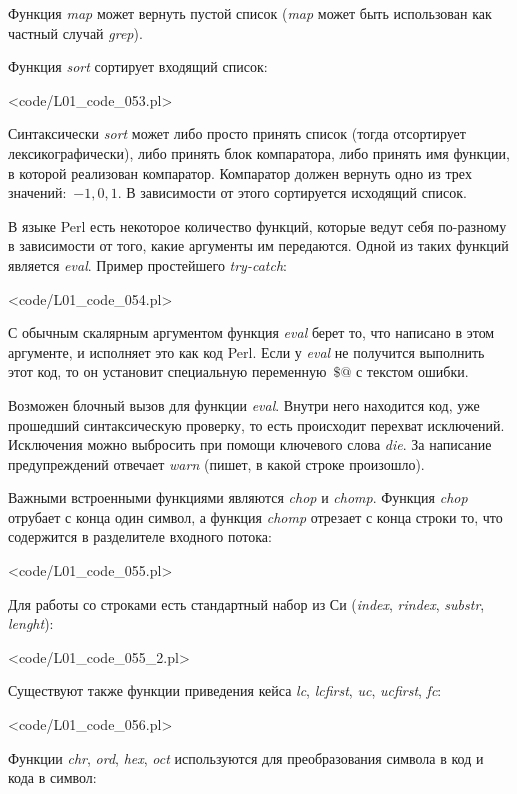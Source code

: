 Функция \textit{map} может вернуть пустой список (\textit{map} может быть использован как частный случай \textit{grep}).

Функция \textit{sort} сортирует входящий список:

\pr<code/L01_code_053.pl>

Синтаксически \textit{sort} может либо просто принять список (тогда отсортирует лексикографически), либо принять блок компаратора, либо принять имя функции, в которой реализован компаратор.
Компаратор должен вернуть одно из трех значений:~$-1,0,1$.
В зависимости от этого сортируется исходящий список.

В языке Perl есть некоторое количество функций, которые ведут себя по-разному в зависимости от того, какие аргументы им передаются.
Одной из таких функций является \textit{eval}.
Пример простейшего \textit{try-catch}:

\pr<code/L01_code_054.pl>

С обычным скалярным аргументом функция \textit{eval} берет то, что написано в этом аргументе, и исполняет это как код Perl.
Если у \textit{eval} не получится выполнить этот код, то он установит специальную переменную~$\$@$ с текстом ошибки.

Возможен блочный вызов для функции \textit{eval}.
Внутри него находится код, уже прошедший синтаксическую проверку, то есть происходит перехват исключений.
Исключения можно выбросить при помощи ключевого слова \textit{die}.
За написание предупреждений отвечает \textit{warn} (пишет, в какой строке произошло).

Важными встроенными функциями являются \textit{chop} и \textit{chomp}.
Функция \textit{chop} отрубает с конца один символ, а функция \textit{chomp} отрезает с конца строки то, что содержится в разделителе входного потока:

\pr<code/L01_code_055.pl>

Для работы со строками есть стандартный набор из Си (\textit{index}, \textit{rindex}, \textit{substr}, \textit{lenght}):

\pr<code/L01_code_055_2.pl>

Существуют также функции приведения кейса \textit{lc}, \textit{lcfirst}, \textit{uc}, \textit{ucfirst}, \textit{fc}:

\pr<code/L01_code_056.pl>

Функции \textit{chr}, \textit{ord}, \textit{hex}, \textit{oct} используются для преобразования символа в код и кода в символ:

